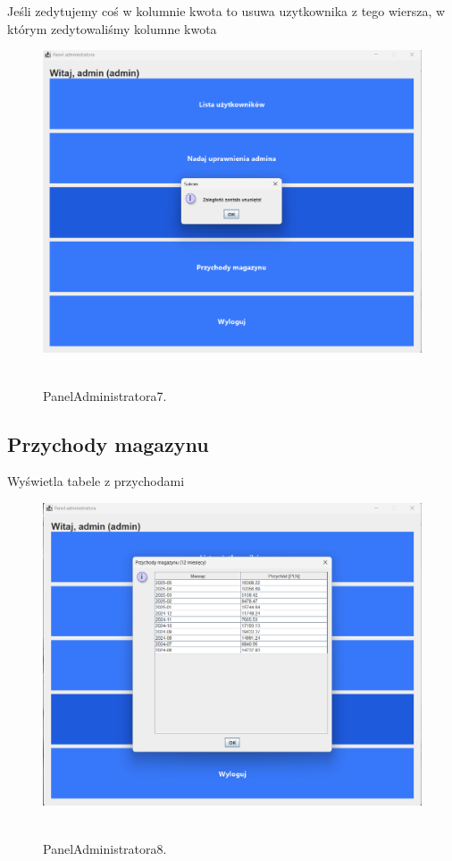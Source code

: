 Jeśli zedytujemy coś w kolumnie kwota to usuwa uzytkownika z tego wiersza, w którym zedytowaliśmy kolumne kwota

\begin{figure}[H]
    \centering
    \includegraphics[width=.9\linewidth]{figures/PanelAdministratora7.png}\
    \caption{PanelAdministratora7.\label{PanelAdministratora7}}
\end{figure}

\subsection{Przychody magazynu}
\label{subsec:Przychody magazynu}

Wyświetla tabele z przychodami

\begin{figure}[H]
    \centering
    \includegraphics[width=.9\linewidth]{figures/PanelAdministratora8.png}\
    \caption{PanelAdministratora8.\label{PanelAdministratora8}}
\end{figure}

